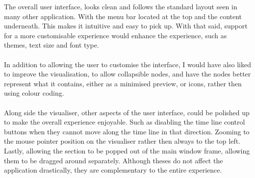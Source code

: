 The overall user interface, looks clean and follows the standard layout seen in many other application. With the menu bar located at the top and the content underneath. This makes it intuitive and easy to pick up. With that said, support for a more customisable experience would enhance the experience, such as themes, text size and font type.
\\\\
In addition to allowing the user to customise the interface, I would have also liked to improve the visualisation, to allow collapsible nodes, and have the nodes better represent what it contains, either as a minimised preview, or icons, rather then using colour coding.
\\\\
Along side the visualiser, other aspects of the user interface, could be polished up to make the overall experience enjoyable. Such as disabling the time line control buttons when they cannot move along the time line in that direction. Zooming to the mouse pointer position on the visualiser rather then always to the top left. Lastly, allowing the section to be popped out of the main window frame, allowing them to be dragged around separately. Although theses do not affect the application drastically, they are complementary to the entire experience.
